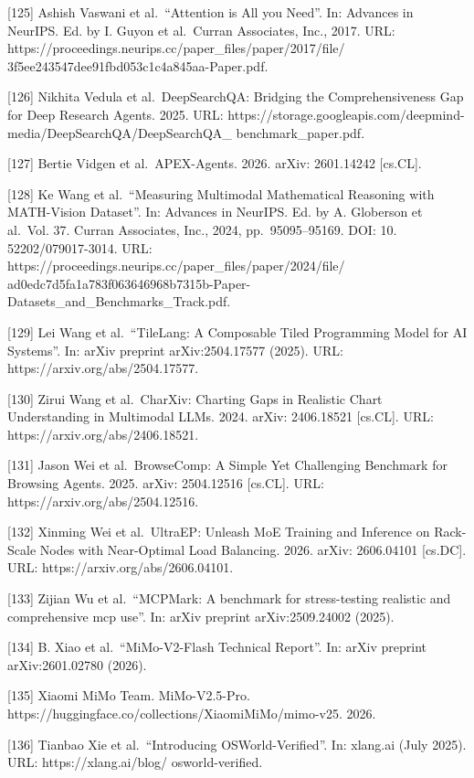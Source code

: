 {[}125{]} Ashish Vaswani et al.~``Attention is All you Need''. In:
Advances in NeurIPS. Ed. by I. Guyon et al.~Curran Associates, Inc.,
2017. URL: https://proceedings.neurips.cc/paper\_files/paper/2017/file/
3f5ee243547dee91fbd053c1c4a845aa-Paper.pdf.

{[}126{]} Nikhita Vedula et al.~DeepSearchQA: Bridging the
Comprehensiveness Gap for Deep Research Agents. 2025. URL:
https://storage.googleapis.com/deepmind-
media/DeepSearchQA/DeepSearchQA\_ benchmark\_paper.pdf.

{[}127{]} Bertie Vidgen et al.~APEX-Agents. 2026. arXiv: 2601.14242
{[}cs.CL{]}.

{[}128{]} Ke Wang et al.~``Measuring Multimodal Mathematical Reasoning
with MATH-Vision Dataset''. In: Advances in NeurIPS. Ed. by A. Globerson
et al.~Vol. 37. Curran Associates, Inc., 2024, pp.~95095--95169. DOI:
10. 52202/079017-3014. URL:
https://proceedings.neurips.cc/paper\_files/paper/2024/file/
ad0edc7d5fa1a783f063646968b7315b-Paper-Datasets\_and\_Benchmarks\_Track.pdf.

{[}129{]} Lei Wang et al.~``TileLang: A Composable Tiled Programming
Model for AI Systems''. In: arXiv preprint arXiv:2504.17577 (2025). URL:
https://arxiv.org/abs/2504.17577.

{[}130{]} Zirui Wang et al.~CharXiv: Charting Gaps in Realistic Chart
Understanding in Multimodal LLMs. 2024. arXiv: 2406.18521 {[}cs.CL{]}.
URL: https://arxiv.org/abs/2406.18521.

{[}131{]} Jason Wei et al.~BrowseComp: A Simple Yet Challenging
Benchmark for Browsing Agents. 2025. arXiv: 2504.12516 {[}cs.CL{]}. URL:
https://arxiv.org/abs/2504.12516.

{[}132{]} Xinming Wei et al.~UltraEP: Unleash MoE Training and Inference
on Rack-Scale Nodes with Near-Optimal Load Balancing. 2026. arXiv:
2606.04101 {[}cs.DC{]}. URL: https://arxiv.org/abs/2606.04101.

{[}133{]} Zijian Wu et al.~``MCPMark: A benchmark for stress-testing
realistic and comprehensive mcp use''. In: arXiv preprint
arXiv:2509.24002 (2025).

{[}134{]} B. Xiao et al.~``MiMo-V2-Flash Technical Report''. In: arXiv
preprint arXiv:2601.02780 (2026).

{[}135{]} Xiaomi MiMo Team. MiMo-V2.5-Pro.
https://huggingface.co/collections/XiaomiMiMo/mimo-v25. 2026.

{[}136{]} Tianbao Xie et al.~``Introducing OSWorld-Verified''. In:
xlang.ai (July 2025). URL: https://xlang.ai/blog/ osworld-verified.

